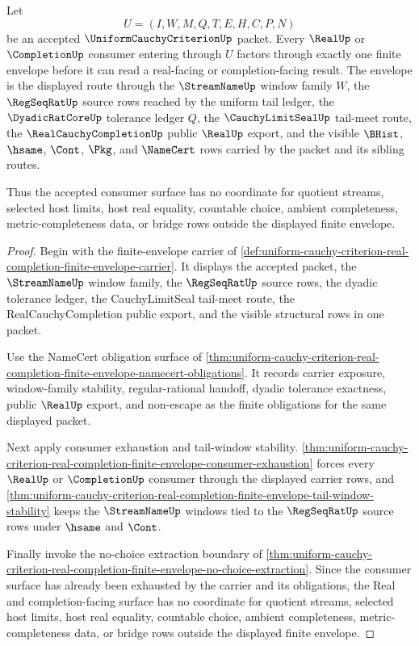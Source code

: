 \begin{theorem}
\label{thm:uniform-cauchy-criterion-real-completion-envelope}
Let
$$
U=(I,W,M,Q,T,E,H,C,P,N)
$$
be an accepted $\UniformCauchyCriterionUp$ packet. Every $\RealUp$ or $\CompletionUp$ consumer entering through $U$ factors through exactly one finite envelope before it can read a real-facing or completion-facing result. The envelope is the displayed route through the $\StreamNameUp$ window family $W$, the $\RegSeqRatUp$ source rows reached by the uniform tail ledger, the $\DyadicRatCoreUp$ tolerance ledger $Q$, the $\CauchyLimitSealUp$ tail-meet route, the $\RealCauchyCompletionUp$ public $\RealUp$ export, and the visible $\BHist$, $\hsame$, $\Cont$, $\Pkg$, and $\NameCert$ rows carried by the packet and its sibling routes.

Thus the accepted consumer surface has no coordinate for quotient streams, selected host limits, host real equality, countable choice, ambient completeness, metric-completeness data, or bridge rows outside the displayed finite envelope.
\end{theorem}
\begin{proof}
Begin with the finite-envelope carrier of \autoref{def:uniform-cauchy-criterion-real-completion-finite-envelope-carrier}. It displays the accepted packet, the $\StreamNameUp$ window family, the $\RegSeqRatUp$ source rows, the dyadic tolerance ledger, the CauchyLimitSeal tail-meet route, the RealCauchyCompletion public export, and the visible structural rows in one packet.

Use the NameCert obligation surface of \autoref{thm:uniform-cauchy-criterion-real-completion-finite-envelope-namecert-obligations}. It records carrier exposure, window-family stability, regular-rational handoff, dyadic tolerance exactness, public $\RealUp$ export, and non-escape as the finite obligations for the same displayed packet.

Next apply consumer exhaustion and tail-window stability. \autoref{thm:uniform-cauchy-criterion-real-completion-finite-envelope-consumer-exhaustion} forces every $\RealUp$ or $\CompletionUp$ consumer through the displayed carrier rows, and \autoref{thm:uniform-cauchy-criterion-real-completion-finite-envelope-tail-window-stability} keeps the $\StreamNameUp$ windows tied to the $\RegSeqRatUp$ source rows under $\hsame$ and $\Cont$.

Finally invoke the no-choice extraction boundary of \autoref{thm:uniform-cauchy-criterion-real-completion-finite-envelope-no-choice-extraction}. Since the consumer surface has already been exhausted by the carrier and its obligations, the Real and completion-facing surface has no coordinate for quotient streams, selected host limits, host real equality, countable choice, ambient completeness, metric-completeness data, or bridge rows outside the displayed finite envelope.
\end{proof}

